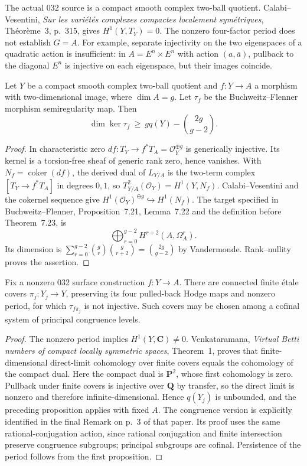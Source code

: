 The actual 032 source is a compact smooth complex two-ball quotient.
Calabi--Vesentini, \emph{Sur les vari\'et\'es complexes compactes
localement sym\'etriques}, Th\'eor\`eme~3, p.~315, gives
$H^1(Y,T_Y)=0$. The nonzero four-factor period does not establish
$G=A$. For example, separate injectivity on the two eigenspaces
of a quadratic action is insufficient: in
$A=E^n\times E^n$ with action $(a,\bar a)$, pullback to the diagonal
$E^n$ is injective on each eigenspace, but their images coincide.

\begin{proposition}
\label{prop:semireg-map-dimension}
Let $Y$ be a compact smooth complex two-ball quotient and
$f:Y\to A$ a morphism with two-dimensional image, where $\dim A=g$.
Let $\tau_f$ be the Buchweitz--Flenner morphism semiregularity map.
Then
\[
 \dim\ker\tau_f\ \geq\ gq(Y)-\binom{2g}{g-2}.
\]
\end{proposition}
\begin{proof}
In characteristic zero $df:T_Y\to f^*T_A=\mathcal O_Y^{\oplus g}$
is generically injective. Its kernel is a torsion-free sheaf of
generic rank zero, hence vanishes. With $N_f=\operatorname{coker}(df)$,
the derived dual of $L_{Y/A}$ is the two-term complex
$[T_Y\to f^*T_A]$ in degrees $0,1$, so
$T^2_{Y/A}(\mathcal O_Y)=H^1(Y,N_f)$.
Calabi--Vesentini and the cokernel sequence give
$H^1(\mathcal O_Y)^{\oplus g}\hookrightarrow H^1(N_f)$.
The target specified in Buchweitz--Flenner, Proposition~7.21,
Lemma~7.22 and the definition before Theorem~7.23, is
\[
 \bigoplus_{r=0}^{g-2}H^{r+2}(A,\Omega_A^r).
\]
Its dimension is
$\sum_{r=0}^{g-2}\binom gr\binom g{r+2}=\binom{2g}{g-2}$
by Vandermonde. Rank--nullity proves the assertion.
\end{proof}

\begin{corollary}
\label{cor:semireg-level-failure}
Fix a nonzero 032 surface construction $f:Y\to A$. There are
connected finite \'etale covers $\pi_j:Y_j\to Y$, preserving its
four pulled-back Hodge maps and nonzero period, for which
$\tau_{f\pi_j}$ is not injective. Such covers may be chosen among
a cofinal system of principal congruence levels.
\end{corollary}
\begin{proof}
The nonzero period implies $H^1(Y,\mathbf C)\ne0$.
Venkataramana, \emph{Virtual Betti numbers of compact locally
symmetric spaces}, Theorem~1, proves that finite-dimensional
direct-limit cohomology over finite covers equals the cohomology
of the compact dual. Here the compact dual is $\mathbf P^2$,
whose first cohomology is zero. Pullback under finite covers is
injective over $\mathbf Q$ by transfer, so the direct limit is
nonzero and therefore infinite-dimensional. Hence $q(Y_j)$ is
unbounded, and the preceding proposition applies with fixed $A$.
The congruence version is explicitly identified in the final Remark
on p.~3 of that paper. Its proof uses the same rational-conjugation
action, since rational conjugation and finite intersection preserve
congruence subgroups; principal subgroups are cofinal.
Persistence of the period follows from the first proposition.
\end{proof}

